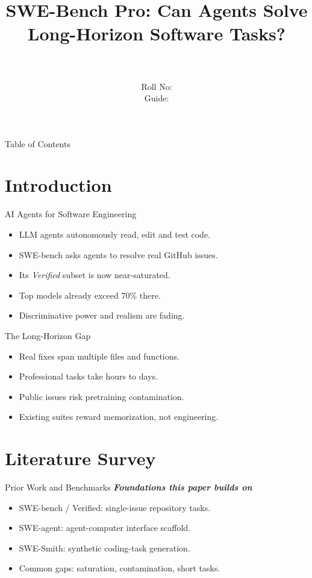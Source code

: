 \documentclass{beamer}
\title[\seminarShortTitle]{SWE-Bench Pro: Can Agents Solve Long-Horizon Software Tasks?}
\author[\seminarName\ (\seminarShortCollege)]{\seminarName \\ \seminarRoll \\ Roll No: \seminarClassRoll \\ Guide: \seminarGuide}
\institute[\seminarShortCollege]{\seminarDept \\ \seminarCollege}
\date{\seminarDate}
\begin{document}
\begin{frame}\titlepage\end{frame}
\begin{frame}{Table of Contents}\tableofcontents\end{frame}
\section{Introduction}
\begin{frame}{AI Agents for Software Engineering}
\begin{itemize}
\item LLM agents autonomously read, edit and test code.
\item SWE-bench asks agents to resolve real GitHub issues.
\item Its \emph{Verified} subset is now near-saturated.
\item Top models already exceed 70\% there.
\item Discriminative power and realism are fading.
\end{itemize}
\end{frame}

\begin{frame}{The Long-Horizon Gap}
\begin{itemize}
\item Real fixes span multiple files and functions.
\item Professional tasks take hours to days.
\item Public issues risk pretraining contamination.
\item Existing suites reward memorization, not engineering.
\end{itemize}
\end{frame}

\section{Literature Survey}
\begin{frame}{Prior Work and Benchmarks}
\textbf{\textit{Foundations this paper builds on}}
\begin{itemize}
\item SWE-bench / Verified: single-issue repository tasks.
\item SWE-agent: agent-computer interface scaffold.
\item SWE-Smith: synthetic coding-task generation.
\item Common gaps: saturation, contamination, short tasks.
\end{itemize}
\end{frame}
\end{document}
